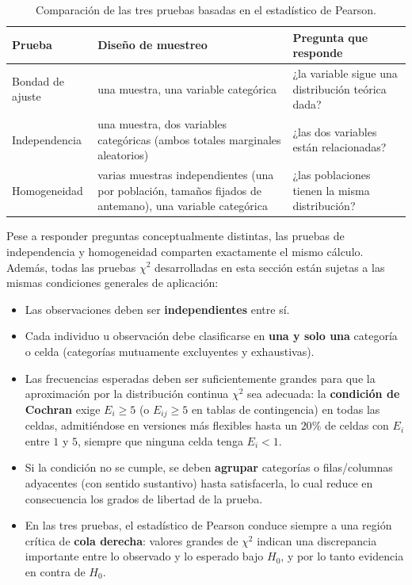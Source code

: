 \documentclass[11pt,a4paper]{article}
\theoremstyle{plain}
\theoremstyle{definition}
\theoremstyle{remark}
\begin{document}
\begin{table}[h]
\centering
\small
\begin{tabular}{@{}p{2.7cm}p{4.3cm}p{5.3cm}@{}}
\toprule
Prueba & Diseño de muestreo & Pregunta que responde \\
\midrule
Bondad de ajuste & una muestra, una variable categórica & ¿la variable sigue una distribución teórica dada? \\[0.6em]
Independencia & una muestra, dos variables categóricas (ambos totales marginales aleatorios) & ¿las dos variables están relacionadas? \\[0.6em]
Homogeneidad & varias muestras independientes (una por población, tamaños fijados de antemano), una variable categórica & ¿las poblaciones tienen la misma distribución? \\
\bottomrule
\end{tabular}
\caption{Comparación de las tres pruebas basadas en el estadístico de Pearson.}
\end{table}

Pese a responder preguntas conceptualmente distintas, las pruebas de independencia y homogeneidad comparten exactamente el mismo cálculo. Además, todas las pruebas $\chi^2$ desarrolladas en esta sección están sujetas a las mismas condiciones generales de aplicación:

\begin{itemize}[nosep]
\item Las observaciones deben ser \textbf{independientes} entre sí.
\item Cada individuo u observación debe clasificarse en \textbf{una y solo una} categoría o celda (categorías mutuamente excluyentes y exhaustivas).
\item Las frecuencias esperadas deben ser suficientemente grandes para que la aproximación por la distribución continua $\chi^2$ sea adecuada: la \textbf{condición de Cochran} exige $E_i\ge5$ (o $E_{ij}\ge5$ en tablas de contingencia) en todas las celdas, admitiéndose en versiones más flexibles hasta un $20\%$ de celdas con $E_i$ entre $1$ y $5$, siempre que ninguna celda tenga $E_i<1$.
\item Si la condición no se cumple, se deben \textbf{agrupar} categorías o filas/columnas adyacentes (con sentido sustantivo) hasta satisfacerla, lo cual reduce en consecuencia los grados de libertad de la prueba.
\item En las tres pruebas, el estadístico de Pearson conduce siempre a una región crítica de \textbf{cola derecha}: valores grandes de $\chi^2$ indican una discrepancia importante entre lo observado y lo esperado bajo $H_0$, y por lo tanto evidencia en contra de $H_0$.
\end{itemize}
\end{document}
